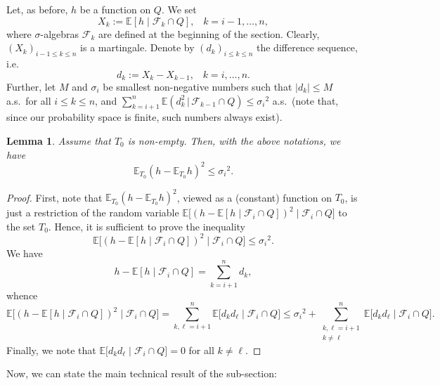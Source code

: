 \documentclass[12pt]{article}
\newtheorem{lemma}[theorem]{Lemma}
\theoremstyle{definition}
\theoremstyle{plain}
\newcommand{\E}{\mathbb{E}}
\begin{document}
Let, as before, $h$ be a function on $Q$. We set
$$X_k:=\E[ h\mid \mathcal{F}_k\cap Q],\;\;\;k=i-1,\ldots,n,$$
where $\sigma$-algebras $\mathcal{F}_k$ are defined at the beginning of the section.
Clearly, $(X_k)_{i-1\leq k\leq n}$ is a martingale. 
Denote by $(d_k)_{i\leq k\leq n}$ the difference sequence, i.e.\
$$d_k:=X_k-X_{k-1},\;\;\;k=i,\ldots, n.$$ 
Further, let $M$ and $\sigma_i$ be smallest non-negative numbers such that $|d_k|\leq M$ a.s.\ for all $i\leq k\leq n$,
and $\sum_{k=i+1}^n\E(d_k^2\,|\,\mathcal F_{k-1}\cap Q)\leq{\sigma_i}^2$ a.s.\ (note that, since our probability space is finite,
such numbers always exist).

\begin{lemma}\label{lem-exp-on-T0}
Assume that $T_0$ is non-empty.
Then, with the above notations, we have
$$
\E_{T_0} ( h-\E_{T_0}  h)^2\leq {\sigma_i}^2.
$$
\end{lemma}
\begin{proof}
First, note that $\E_{T_0} ( h-\E_{T_0}  h)^2$, viewed as a (constant) function on $T_0$,
is just a restriction of the random variable $\E\big[( h-\E[h\mid \mathcal{F}_i\cap Q])^2\mid \mathcal{F}_i\cap Q\big]$
to the set $T_0$. Hence, it is sufficient to prove the inequality
$$\E\big[( h-\E[h\mid \mathcal{F}_i\cap Q])^2\mid \mathcal{F}_i\cap Q\big]\leq {\sigma_i}^2.$$
We have
$$h-\E[h\mid \mathcal{F}_i\cap Q]=\sum_{k=i+1}^n d_k,$$
whence
$$\E\big[( h-\E[h\mid \mathcal{F}_i\cap Q])^2\mid \mathcal{F}_i\cap Q\big]
= \sum_{k,\ell=i+1}^n \E\big[d_k d_\ell\mid \mathcal{F}_i\cap Q\big]\leq {\sigma_i}^2
+\sum_{\substack{k,\ell=i+1\\k\neq \ell}}^n\E\big[d_k d_\ell\mid \mathcal{F}_i\cap Q\big].$$
Finally, we note that $\E\big[d_k d_\ell\mid \mathcal{F}_i\cap Q\big]=0$ for all $k\neq \ell$.
\end{proof}

Now, we can state the main technical result of the sub-section:
\end{document}
